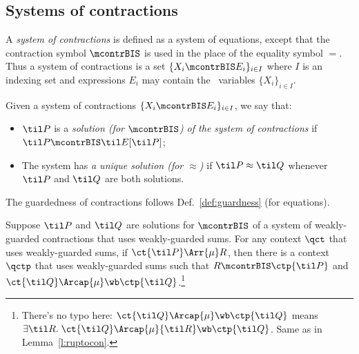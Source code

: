 \subsection{Systems of contractions}
\label{ss:SysContr}

A \emph{system of contractions} is defined as a system of equations,
except that the contraction symbol $\mcontrBIS$ is used in the place of
the equality symbol $=$. Thus a system of contractions is a set
$\{  X_i \mcontrBIS E_i\}_{i\in I}$
where $I$ is an  indexing set and expressions
$E_i$  may contain the  \behavC\  variables
$\{  X_i\}_{i\in I}$.

\begin{definition}
\label{d:uniContra}
Given a system of contractions
$\{  X_i \mcontrBIS E_i\}_{i\in I}$,
 we say that:
\begin{itemize}
\item $\til P$ is a \emph{solution (for $\mcontrBIS$) of the
 system of contractions} if $\til P \mcontrBIS \til E [\til P]$;
\item The system has \emph{a unique solution (for $\approx$)}
if $\til P \approx \til Q$ whenever $\til P$ and $\til Q$ are both solutions.
\end{itemize}
\end{definition}

The guardedness of contractions follows Def.~\ref{def:guardness} (for equations).

\begin{lemma}
\label{l:uptocon}
Suppose $\til P$ and $\til Q$ are solutions  for $\mcontrBIS$
 of a system of weakly-guarded contractions that uses
weakly-guarded sums.
For any context $\qct$  that uses
weakly-guarded sums,
if  $\ct{\til P}\Arr{\mu}  R$,
 then
there is a context $\qctp$  that uses
weakly-guarded sums
such that $R \mcontrBIS \ctp{\til P}$ and $\ct{\til Q} \Arcap{\mu}
 \wb \ctp{\til Q}$.\footnote{There's no typo here: $\ct{\til Q} \Arcap{\mu} \wb \ctp{\til
     Q}$ means $\exists {\til R}.\; \ct{\til Q} \Arcap{\mu} {\til R}
   \wb \ctp{\til Q}$. Same as in Lemma~\ref{l:ruptocon}.}
\end{lemma}

